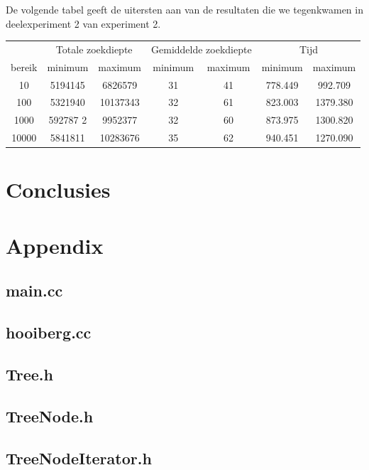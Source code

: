 \documentclass[a4paper,10pt]{article}
\begin{document}
De volgende tabel geeft de uitersten aan van de resultaten die we tegenkwamen in deelexperiment 2 van experiment 2. \\

\begin{center}
\begin{tabular}{c c c c c c c}
 & \multicolumn{2}{c}{Totale zoekdiepte} & \multicolumn{2}{c}{Gemiddelde zoekdiepte} & \multicolumn{2}{c}{Tijd}\\ 
bereik & minimum & maximum & minimum & maximum & minimum & maximum \\
10 & 5194145 & 6826579 & 31 &  41 & 778.449 & 992.709 \\
100 & 5321940 & 10137343 & 32 & 61 & 823.003 & 1379.380 \\
1000 & 592787 2& 9952377 & 32 & 60 & 873.975 & 1300.820 \\
10000 & 5841811 & 10283676 & 35 & 62 & 940.451 & 1270.090 \\
\end{tabular}
\end{center}
\section{Conclusies}

\section{Appendix}

\subsection{main.cc}

\subsection{hooiberg.cc}

\subsection{Tree.h}

\subsection{TreeNode.h}

\subsection{TreeNodeIterator.h}

\end{document}
